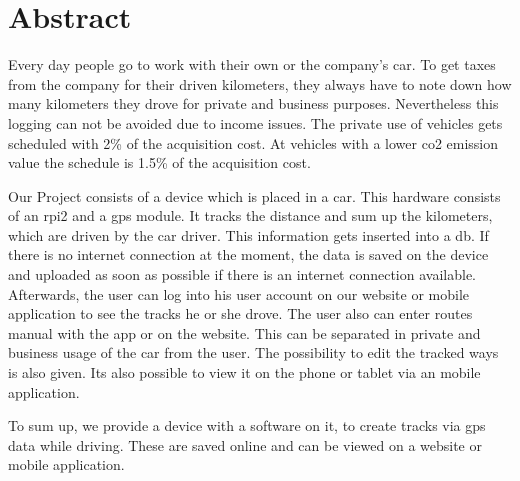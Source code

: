 \chapter*{Abstract}
Every day people go to work with their own or the company's car. To get taxes from the company for their driven kilometers, they always have to note down how many kilometers they drove for private and business purposes. Nevertheless this logging can not be avoided due to income issues. The private use of vehicles gets scheduled with 2\% of the acquisition cost. At vehicles with a lower \gls{co2} emission value the schedule is 1.5\% of the acquisition cost.

Our Project consists of a device which is placed in a car. This hardware consists of an \gls{rpi2} and a \gls{gps} module. It tracks the distance and sum up the kilometers, which are driven by the car driver. This information gets inserted into a \gls{db}. If there is no internet connection at the moment, the data is saved on the device and uploaded as soon as possible if there is an internet connection available. Afterwards, the user can log into his user account on our website or mobile application to see the tracks he or she drove. The user also can enter routes manual with the app or on the website. This can be separated in private and business usage of the car from the user. The possibility to edit the tracked ways is also given. Its also possible to view it on the phone or tablet via an mobile application.

To sum up, we provide a device with a software on it, to create tracks via \gls{gps} data while driving. These are saved online and can be viewed on a website or mobile application.